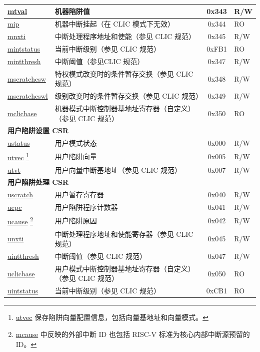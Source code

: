 \begin{longtable}{ | p{4.0cm} | p{8.4cm} | c | l | }
\hyperref[regdesc:MTVAL]{mtval} & 机器陷阱值 & 0x343 & R/W \\\hline
\hyperref[regdesc:MIP_REG]{mip} & 机器中断挂起（在 CLIC 模式下无效） & 0x344 & RO \\\hline
\hyperref[regdesc:MNXTI_REG]{mnxti} & 中断处理程序地址和使能（参见 CLIC 规范） & 0x345 & R/W \\\hline
\hyperref[regdesc:MINTSTATUS]{mintstatus} & 当前中断级别（参见 CLIC 规范） & 0xFB1 & RO \\\hline
\hyperref[regdesc:MINTTHRESH]{mintthresh} & 中断阈值（参见CLIC 规范）& 0x347 & R/W \\\hline
\hyperref[regdesc:MSCRATCHCSW_REG]{mscratchcsw} & 特权模式改变时的条件暂存交换（参见 CLIC 规范） & 0x348 & R/W \\\hline
\hyperref[regdesc:MSCRATCHCSWL_REG]{mscratchcswl} & 级别改变时的条件暂存交换（参见 CLIC 规范） & 0x349 & R/W \\\hline
\hyperref[regdesc:MCLICBASE_REG]{mclicbase} & 机器模式中断控制器基地址寄存器（自定义）（参见 CLIC 规范） & 0x350 & RO \\\hline

\multicolumn{4}{|l|}{\textbf{用户陷阱设置 CSR}} \\\hline
\hyperref[regdesc:USTATUS]{ustatus} & 用户模式状态 & 0x000 & R/W \\\hline
\hyperref[regdesc:UTVEC]{utvec} \footnote{\hyperref[regdesc:UTVEC]{utvec} 保存陷阱向量配置信息，包括向量基地址和向量模式。} & 用户陷阱向量 & 0x005 & R/W \\\hline
\hyperref[regdesc:UTVT]{utvt} & 用户向量中断基地址（参见 CLIC 规范） & 0x007 & R/W \\\hline
\multicolumn{4}{|l|}{\textbf{用户陷阱处理 CSR}} \\\hline
\hyperref[regdesc:USCRATCH]{uscratch} & 用户暂存寄存器 & 0x040 & R/W \\\hline
\hyperref[regdesc:UEPC]{uepc} & 用户陷阱程序计数器 & 0x041 & R/W \\\hline
\hyperref[regdesc:UCAUSE]{ucause} \footnote{\hyperref[regdesc:MCAUSE]{mcause} 中反映的外部中断 ID 也包括 RISC-V 标准为核心内部中断源预留的 ID。} & 用户陷阱原因 & 0x042 & R/W \\\hline
\hyperref[regdesc:UNXTI_REG]{unxti} & 中断处理程序地址和使能寄存器（参见 CLIC 规范） & 0x045 & R/W \\\hline
\hyperref[regdesc:UINTTHRESH]{uintthresh} & 中断阈值（参见 CLIC 规范） & 0x047 & R/W \\\hline
\hyperref[regdesc:UCLICBASE_REG]{uclicbase} & 用户模式中断控制器基地址寄存器（自定义）（参见 CLIC 规范） & 0x050 & RO \\\hline
\hyperref[regdesc:UINTSTATUS]{uintstatus} & 当前中断级别（参见 CLIC 规范） & 0xCB1 & RO \\\hline


\end{longtable}
